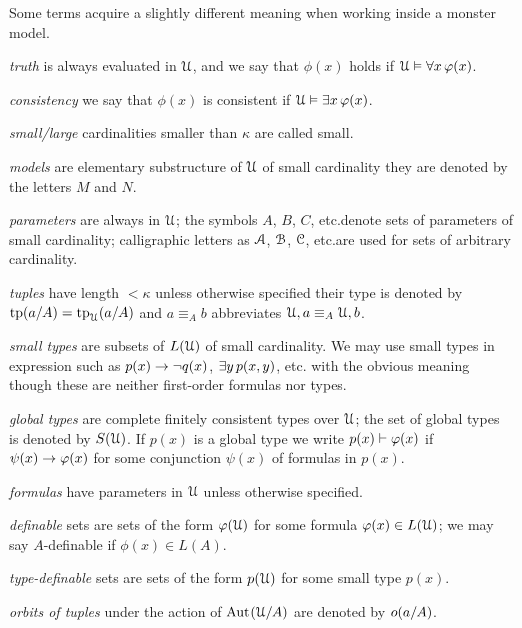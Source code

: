 Some terms acquire a slightly different meaning when working inside a monster model.


\newcommand{\labellalunga}[1]{#1\hfill}
\newenvironment{litemize}[1]
   {\begin{list}{}{
   \setlength{\parskip}{0mm}
   \setlength{\topsep}{5mm}
   \setlength{\partopsep}{0mm}
   \setlength{\rightmargin}{0mm}
   \setlength{\listparindent}{0mm}
   \setlength{\itemindent}{0mm}
   \setlength{\itemsep}{1mm}
   \settowidth{\labelwidth}{#1}
   \setlength{\parsep}{0mm}
   \setlength{\partopsep}{0mm}
   \setlength{\labelsep}{3mm}
   \setlength{\leftmargin}{\labelwidth+\labelsep}
   \let\makelabel\labellalunga}}{
   \end{list}}

\begin{litemize}{type-definable}
\item[\emph{truth}] is always evaluated in $\EuScript U$, and we say that $\phi(x)$ holds if $\EuScript U\vDash\forall x\,\varphi(x)$.
\item[\emph{consistency}] we say that $\phi(x)$ is consistent if $\EuScript U\vDash\exists x\,\varphi(x)$.
\item[\emph{small/large}] cardinalities smaller than $\kappa$ are called small. 
\item[\emph{models}] are elementary substructure of $\EuScript U$ of small cardinality they are denoted by the letters $M$ and $N$.
\item[\emph{parameters}] are always in $\EuScript U$; the symbols $A$, $B$, $C$, etc.\@ denote sets of parameters of small cardinality; calligraphic letters as $\EuScript A$, $\EuScript B$, $\EuScript C$, etc.\@ are used for sets of arbitrary cardinality.
\item[\emph{tuples}] have length $<\kappa$ unless otherwise specified their type is denoted by ${\rm tp}(a/A)={\rm tp}_\EuScript U(a/A)$ and $a\equiv_A b$ abbreviates $\EuScript U,a \equiv_A \EuScript U,b$.
\item[\emph{small types}] are subsets of $L(\EuScript U)$ of small cardinality.
We may use small types in expression such as $p(x)\rightarrow\neg q(x)$, $\exists y\,p(x,y)$, etc. with the obvious meaning though these are neither first-order formulas nor types.
\item[\emph{global types}] are complete finitely consistent types over $\EuScript U$; the set of global types is denoted by $S(\EuScript U)$. If $p(x)$ is a global type we write $p(x)\vdash\varphi(x)$ if $\psi(x)\rightarrow\varphi(x)$ for some conjunction $\psi(x)$ of formulas in $p(x)$.
\item[\emph{formulas}] have parameters in $\EuScript U$ unless otherwise specified.
\item[\emph{definable}] sets are sets of the form $\varphi(\EuScript U)$ for some formula $\varphi(x)\in L(\EuScript U)$; we may say $A$-definable if $\phi(x)\in L(A)$.
\item[\emph{type-definable}] sets are sets of the form $p(\EuScript U)$ for some small type $p(x)$.
\item[\emph{orbits of tuples}] under the action of ${\rm Aut\kern.15ex}(\EuScript U/A)$ are denoted by $o(a/A)$.
\end{litemize}

